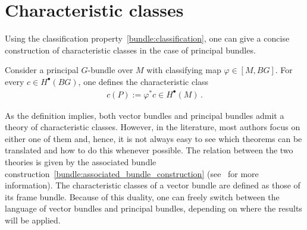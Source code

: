 \section{Characteristic classes}


    Using the classification property~\ref{bundle:classification}, one can give a concise construction of characteristic classes in the case of principal bundles.
    \begin{construct}
        Consider a principal $G$-bundle over $M$ with classifying map $\varphi\in[M,BG]$. For every $c\in H^\bullet(BG)$, one defines the characteristic class
        \begin{gather}
            c(P):=\varphi^*c\in H^\bullet(M)\,.
        \end{gather}
    \end{construct}

    As the definition implies, both vector bundles and principal bundles admit a theory of characteristic classes. However, in the literature, most authors focus on either one of them and, hence, it is not always easy to see which theorems can be translated and how to do this whenever possible. The relation between the two theories is given by the associated bundle construction~\ref{bundle:associated_bundle_construction} (see~\citet{sorensen_introduction_2017} for more information). The characteristic classes of a vector bundle are defined as those of its frame bundle. Because of this duality, one can freely switch between the language of vector bundles and principal bundles, depending on where the results will be applied.

